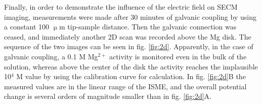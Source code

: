 \documentclass[3p]{elsarticle}
\begin{document}
Finally, in order to demonstrate the influence of the electric field on SECM imaging, measurements were made after 30 minutes of galvanic coupling by using a constant 100 $\upmu$m tip-sample distance. 
Then the galvanic connection was ceased, and immediately another 2D scan was recorded above the Mg disk. The sequence of the two images can be seen in fig. \ref{fig:2d}. Apparently, in the case of galvanic coupling, a 0.1 M Mg$^{2+}$ activity is monitored even in the bulk of the solution, whereas above the center of the disk the activity reaches the implausible 10$^{4}$ M value by using the calibration curve for calculation.   
In fig. \ref{fig:2d}B the measured values are in the linear range of the ISME, and the overall potential change is several orders of magnitude smaller than in fig. \ref{fig:2d}A.


\def\s{0.35}
\end{document}
